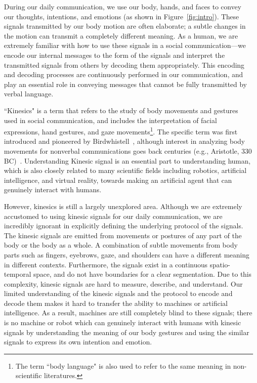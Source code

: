 During our daily communication, we use our body, hands, and faces to convey our thoughts, intentions, and emotions (as shown in Figure~\ref{fig:intro}). These signals transmitted by our body motion are often elaborate; a subtle changes in the motion can transmit a completely different meaning. As a human, we are extremely familiar with how to use these signals in a social communication---we encode our internal messages to the form of the signals and interpret the transmitted signals from others by decoding them appropriately. This encoding and decoding processes are continuously performed in our communication, and play an essential role in conveying messages that cannot be fully transmitted by verbal language.  

``Kinesics" is a term that refers to the study of body movements and gestures used in social communication, and includes the interpretation of facial expressions, hand gestures, and gaze movements\footnote{The term ``body language" is also used to refer to the same meaning in non-scientific literatures.}. The specific term was first introduced and pioneered by Birdwhistell~\cite{Birdwhistell52,Birdwhistell-1970}, although interest in analyzing body movements for nonverbal communications goes back centuries (e.g., Aristotle, 330 BC)~\cite{dael2015measuring}. Understanding Kinesic signal is an essential part to understanding human, which is also closely related to many scientific fields including robotics, artificial intelligence, and virtual reality, towards making an artificial agent that can genuinely interact with humans. 


However, kinesics is still a largely unexplored area. Although we are extremely accustomed to using kinesic signals for our daily communication, we are incredibly ignorant in explicitly defining the underlying protocol of the signals. The kinesic signals are emitted from movements or postures of any part of the body or the body as a whole. A combination of subtle movements from body parts such as fingers, eyebrows, gaze, and shoulders can have a different meaning in different contexts. Furthermore, the signals exist in a continuous spatio-temporal space, and do not have boundaries for a clear segmentation. Due to this complexity, kinesic signals are hard to measure, describe, and understand. Our limited understanding of the kinesic signals and the protocol to encode and decode them makes it hard to transfer the ability to machines or artificial intelligence. As a result, machines are still completely blind to these signals; there is no machine or robot which can genuinely interact with humans with kinesic signals by understanding the meaning of our body gestures and using the similar signals to express its own intention and emotion. 


